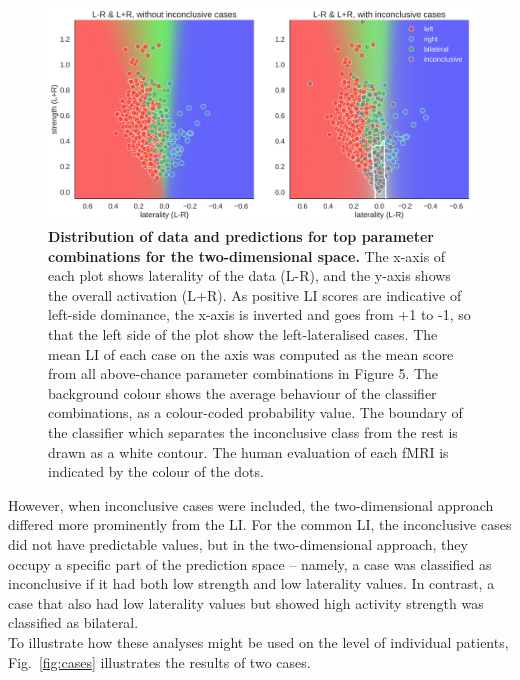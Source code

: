 \documentclass[fleqn,10pt]{SelfArx} %
\begin{document}
\begin{figure}[htb]
	\begin{minipage}{\textwidth}
		\renewcommand{\familydefault}{\sfdefault}\normalfont
		\centering
		\includegraphics[width=0.9\columnwidth]{../reports/figures/11-swarm-2d.png}
		\caption{\textbf{Distribution of data and predictions for top parameter combinations for the two-dimensional space.} The x-axis of each plot shows laterality of the data (L-R), and the y-axis shows the overall activation (L+R). As positive LI scores are indicative of left-side dominance, the x-axis is inverted and goes from +1 to -1, so that the left side of the plot show the left-lateralised cases. The mean LI of each case on the axis was computed as the mean score from all above-chance parameter combinations in Figure 5. The background colour shows the average behaviour of the classifier combinations, as a colour-coded probability value. The boundary of the classifier which separates the inconclusive class from the rest is drawn as a white contour. The human evaluation of each fMRI is indicated by the colour of the dots.}%
		\label{fig:swarm2d}
	\end{minipage}
\end{figure}

However, when inconclusive cases were included, the two-dimensional approach differed more prominently from the LI. For the common LI, the inconclusive cases did not have predictable values, but in the two-dimensional approach, they occupy a specific part of the prediction space – namely, a case was classified as inconclusive if it had both low strength and low laterality values. In contrast, a case that also had low laterality values but showed high activity strength was classified as bilateral.\\
To illustrate how these analyses might be used on the level of individual patients, Fig.~\ref{fig:cases} illustrates the results of two cases.
\end{document}
